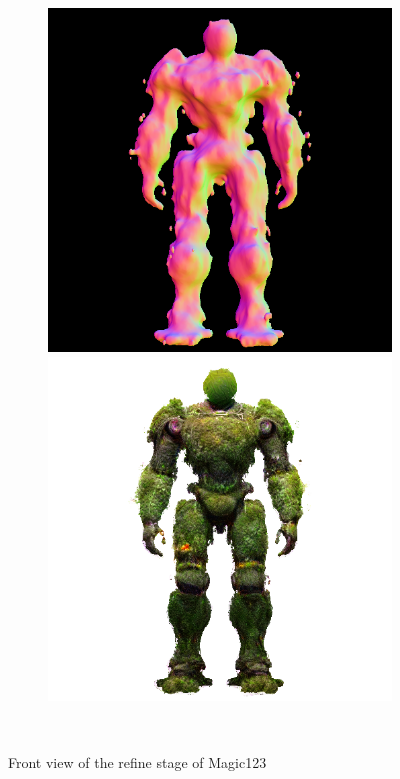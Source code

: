 \begin{figure}[H]
\begin{subfigure}[b]{0.25\textwidth}
        \caption{}
    \end{subfigure}
    \begin{subfigure}[b]{0.25\textwidth}
        \centering
        \fontsize{9pt}{7pt}\selectfont{}\vspace{.1cm}
        \includegraphics[width=\textwidth]{etc/a robot made out of plants/magic123/magic123_refine_robot_front_10000_part2.png}
        \includegraphics[width=\textwidth]{etc/a robot made out of plants/magic123/magic123_refine_robot_front_10000_part1.png}
        \caption{}
    \end{subfigure}
    \caption{Front view of the refine stage of Magic123}~\label{fig:generationFrontRefineMagic123}
\end{figure}

